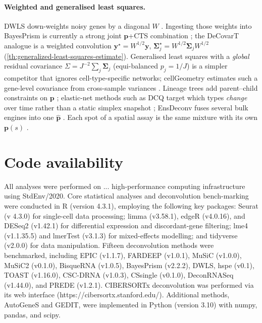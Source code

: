 \documentclass[pdflatex, sn-nature]{sn-jnl}
\theoremstyle{thmstyleone}%
\theoremstyle{thmstyletwo}%
\theoremstyle{thmstylethree}%
\begin{document}
    \paragraph{Weighted and generalised least squares.}
    DWLS down-weights noisy genes by a diagonal $W$
    \cite{tsoucasAccurateEstimationCelltype2019}. Ingesting those weights
    into BayesPrism is currently a strong joint $\boldsymbol{p}$+CTS combination
    \cite{zhangIntegratedInferenceCellularCompositions2026}; the DeCovarT
    analogue is a weighted convolution
    $\boldsymbol{y}^{\star}=W^{1/2}\boldsymbol{y}$,
    $\boldsymbol{\Sigma}_{j}^{\star}=W^{1/2}\boldsymbol{\Sigma}_{j}W^{1/2}$
    (\ref{th:generalized-least-squares-estimate}).
    Generalised least squares with a \emph{global} residual covariance
    $\Sigma=J^{-2}\sum_{j}\boldsymbol{\Sigma}_{j}$ (equi-balanced $p_{j}=1/J$) is
    a simpler competitor that ignores cell-type-specific networks;
    cellGeometry estimates such a gene-level covariance from cross-sample
    variances \cite{lauCellGeometryUltrafastSinglecell2026}. Lineage trees
    add parent--child constraints on $\boldsymbol{p}$
    \cite{wangBulkTissueCell2019}; elastic-net methods such as DCQ target
    which types \emph{change} over time rather than a static simplex
    snapshot \cite{altboumDigitalCellQuantification2014}; EnsDeconv fuses
    several bulk engines into one $\hat{\boldsymbol{p}}$
    \cite{caiRobustAccurateEstimation2022}. Each spot of a spatial assay is
    the same mixture with its own $\boldsymbol{p}(s)$
    \cite{gaspard-boulincCelltypeDeconvolutionMethods2025}.

    \section{Code availability}

    All analyses were performed on ... high-performance computing infrastructure
    using StdEnv/2020. Core statistical analyses and deconvolution bench-marking
    were conducted in R (version 4.3.1), employing the following key packages:
    Seurat (v 4.3.0) for single-cell data processing; limma (v3.58.1), edgeR (v4.0.16),
    and DESeq2 (v1.42.1) for differential expression and discordant-gene
    filtering; lme4 (v1.1.35.5) and lmerTest (v3.1.3) for mixed-effects
    modelling; and tidyverse (v2.0.0) for data manipulation. Fifteen
    deconvolution methods were benchmarked, including EPIC (v1.1.7), FARDEEP (v1.0.1),
    MuSiC (v1.0.0), MuSiC2 (v0.1.0), BisqueRNA (v1.0.5), BayesPrism (v2.2.2), DWLS,
    hspe (v0.1), TOAST (v1.16.0), CSC-DRNA (v1.0.3), CSsingle (v0.1.0), DeconRNASeq
    (v1.44.0), and PREDE (v1.2.1). CIBERSORTx deconvolution was performed via its
    web interface (https://cibersortx.stanford.edu/). Additional methods,
    AutoGeneS and GEDIT, were implemented in Python (version 3.10) with numpy,
    pandas, and scipy.
\end{document}
